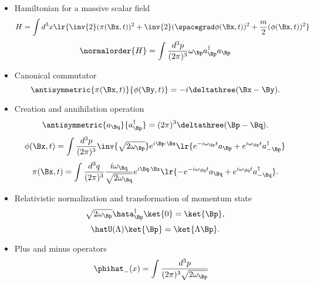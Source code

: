 \begin{itemize}
\item Hamiltonian for a massive scalar field
\begin{equation}\label{eqn:usefulFormulas:360}
H
= \int d^3 x \lr{ \inv{2} (\pi(\Bx, t))^2 + \inv{2} (\spacegrad \phi(\Bx, t))^2 + \frac{m}{2} (\phi(\Bx, t))^2 }
\end{equation}
\begin{equation}\label{eqn:usefulFormulas:380}
\normalorder{H}
= \int \frac{d^3 p}{(2 \pi)^3} \omega_\Bp a_\Bp^\dagger a_\Bp
\end{equation}
\item Canonical commutator
\begin{equation}\label{eqn:usefulFormulas:400}
\antisymmetric{\pi(\Bx, t)}{\phi(\By, t)} = -i \deltathree(\Bx - \By).
\end{equation}
\item Creation and annihilation operation
\begin{equation}\label{eqn:usefulFormulas:420}
\antisymmetric
{a_\Bq}
{a^\dagger_\Bp}
=
(2 \pi)^3
\deltathree(\Bp - \Bq).
\end{equation}
\begin{equation}\label{eqn:usefulFormulas:440}
\phi(\Bx, t)
=
\int \frac{d^3 p}{(2\pi)^3} \inv{\sqrt{2 \omega_\Bp}} e^{i \Bp \cdot \Bx}
\lr{
   e^{-i \omega_\Bp t} a_\Bp
   +
   e^{i \omega_\Bp t} a_{-\Bp}^\dagger
}
\end{equation}
\begin{equation}\label{eqn:usefulFormulas:460}
\pi(\Bx, t)
=
\int \frac{d^3 q}{(2\pi)^3}
\frac{i \omega_\Bq }{ \sqrt{2 \omega_\Bq}}
e^{i \Bq \cdot \Bx}
\lr{
   -e^{-i \omega_\Bq t} a_\Bq
   +
   e^{i \omega_\Bq t} a_{-\Bq}^\dagger
}.
\end{equation}
\item Relativistic normalization and transformation of momentum state
\begin{equation}\label{eqn:usefulFormulas:580}
\sqrt{2 \omega_{ \Bp}} \hata^\dagger_{ \Bp} \ket{0} = \ket{\Bp},
\end{equation}
\begin{equation}\label{eqn:usefulFormulas:600}
\hatU(\Lambda) \ket{\Bp} = \ket{\Lambda \Bp}.
\end{equation}
\item Plus and minus operators
\begin{equation}\label{eqn:usefulFormulas:620}
\begin{aligned}
\phihat_{-}(x) &=
\int \frac{d^3 p}{(2 \pi)^3 \sqrt{2 \omega_\Bp}}

\end{aligned}
\end{equation}
\end{itemize}
